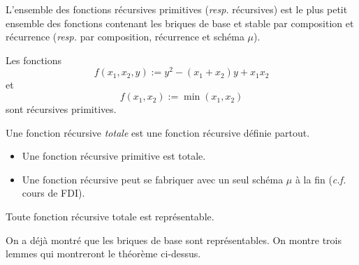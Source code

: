 \documentclass[./main]{subfiles}
\begin{document}
  \begin{defn}
    L'ensemble des fonctions récursives primitives (\textit{resp.} récursives) est le plus petit ensemble des fonctions contenant les briques de base et stable par composition  et récurrence (\textit{resp.} par composition, récurrence et schéma $\mu$).
  \end{defn}

  \begin{exm}
    Les fonctions \[
    f(x_1, x_2, y) := y^2 - (x_1+x_2) y + x_1 x_2
    \]et\[
    f(x_1, x_2) := \min(x_1, x_2)
    \] sont récursives primitives.
  \end{exm}

  \begin{defn}
    Une fonction récursive \textit{totale} est une fonction récursive définie partout.
  \end{defn}

  \begin{rmk}
    \begin{itemize}
      \item Une fonction récursive primitive est totale.
      \item Une fonction récursive peut se fabriquer avec un seul schéma $\mu$ à la fin (\textit{c.f.} cours de FDI).
    \end{itemize}
  \end{rmk}

  \begin{thm}
    Toute fonction récursive totale est représentable.
    \label{thm:rec-repr}
  \end{thm}
  On a déjà montré que les briques de base sont représentables.
  On montre trois lemmes qui montreront le théorème ci-dessus.
\end{document}
